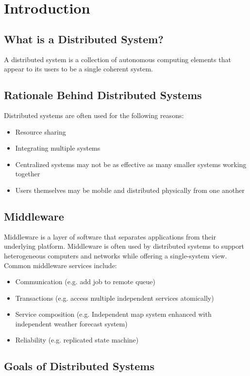 \documentclass[12pt,titlepage]{article}
\begin{document}
  \newpage

  \section{Introduction}
    \subsection{What is a Distributed System?}
      A distributed system is a collection of autonomous computing elements that appear to its users to be a single coherent system.

    \subsection{Rationale Behind Distributed Systems}
      Distributed systems are often used for the following reasons:
      \begin{itemize}
        \item Resource sharing
        \item Integrating multiple systems
        \item Centralized systems may not be as effective as many smaller systems working together
        \item Users themselves may be mobile and distributed physically from one another
      \end{itemize}

    \subsection{Middleware}
      Middleware is a layer of software that separates applications from their underlying platform. Middleware is often used by distributed
      systems to support heterogeneous computers and networks while offering a single-system view. Common middleware services include:
      \begin{itemize}
        \item Communication (e.g. add job to remote queue)
        \item Transactions (e.g. access multiple independent services atomically)
        \item Service composition (e.g. Independent map system enhanced with independent weather forecast system)
        \item Reliability (e.g. replicated state machine)
      \end{itemize}

    \subsection{Goals of Distributed Systems}
\end{document}
